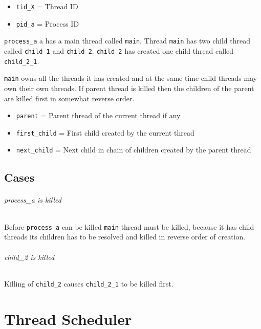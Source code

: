 \begin{itemize}
  \item \verb+tid_X+ = Thread ID
  \item \verb+pid_a+ = Process ID
\end{itemize}

\verb+process_a+ a has a main thread called \verb+main+. Thread
\verb+main+ has two child thread called \verb+child_1+ and \verb+child_2+.
\verb+child_2+ has created one child thread called \verb+child_2_1+.

\verb+main+ owns all the threads it has created and at the same time child
threads may own their own threads. If parent thread is killed then the
children of the parent are killed first in somewhat reverse order.

\begin{itemize}
  \item \verb+parent+ = Parent thread of the current thread if any
  \item \verb+first_child+ = First child created by the current thread
  \item \verb+next_child+ = Next child in chain of children created by the
        parent thread
\end{itemize}

\section{Cases}
\subparagraph*{process\_a is killed}

Before \verb+process_a+ can be killed \verb+main+ thread must be killed,
because it has child threads its children has to be resolved and killed in
reverse order of creation.

\subparagraph*{child\_2 is killed}

Killing of \verb+child_2+ causes \verb+child_2_1+ to be killed first.


\chapter{Thread Scheduler}

